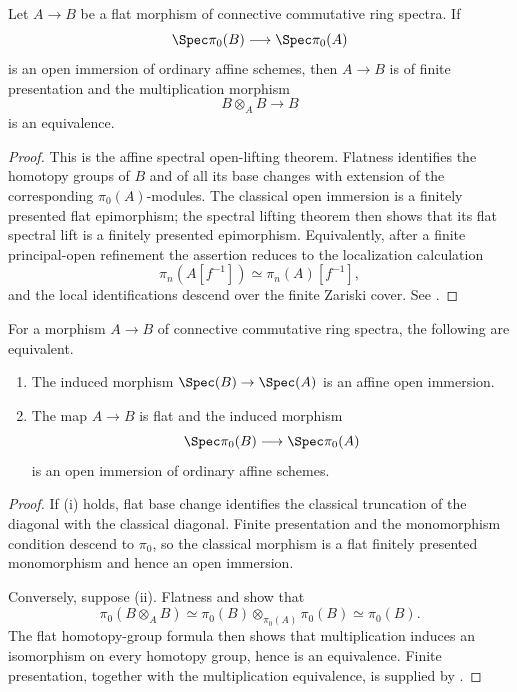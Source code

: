 \begin{proposition}
\label{prop:flat-lift-classical-affine-open}
Let $A\to B$ be a flat morphism of connective commutative ring spectra.
If
\[
    \Spec\pi_0(B)
    \longrightarrow
    \Spec\pi_0(A)
\]
is an open immersion of ordinary affine schemes, then $A\to B$ is of
finite presentation and the multiplication morphism
\[
    B\otimes_A B
    \longrightarrow
    B
\]
is an equivalence.
\end{proposition}

\begin{proof}
This is the affine spectral open-lifting theorem. Flatness identifies the
homotopy groups of $B$ and of all its base changes with extension of the
corresponding $\pi_0(A)$-modules. The classical open immersion is a
finitely presented flat epimorphism; the spectral lifting theorem then
shows that its flat spectral lift is a finitely presented epimorphism.
Equivalently, after a finite principal-open refinement the assertion
reduces to the localization calculation
\[
    \pi_n(A[f^{-1}])
    \simeq
    \pi_n(A)[f^{-1}],
\]
and the local identifications descend over the finite Zariski cover. See
\cite{LurieSAG,KhanBraveNewMotivicI}.
\end{proof}

\begin{theorem}
\label{thm:classical-characterization-affine-opens}
For a morphism $A\to B$ of connective commutative ring spectra, the
following are equivalent.
\begin{enumerate}[label=(\roman*)]
    \item The induced morphism $\Spec(B)\to\Spec(A)$ is an affine open
    immersion.

    \item The map $A\to B$ is flat and the induced morphism
    \[
        \Spec\pi_0(B)
        \longrightarrow
        \Spec\pi_0(A)
    \]
    is an open immersion of ordinary affine schemes.
\end{enumerate}
\end{theorem}

\begin{proof}
If (i) holds, flat base change identifies the classical truncation of the
diagonal with the classical diagonal. Finite presentation and the
monomorphism condition descend to $\pi_0$, so the classical morphism is a
flat finitely presented monomorphism and hence an open immersion.

Conversely, suppose (ii). Flatness and
 show that
\[
    \pi_0(B\otimes_A B)
    \simeq
    \pi_0(B)
    \otimes_{\pi_0(A)}
    \pi_0(B)
    \simeq
    \pi_0(B).
\]
The flat homotopy-group formula then shows that multiplication induces an
isomorphism on every homotopy group, hence is an equivalence. Finite
presentation, together with the multiplication equivalence, is supplied by
.
\end{proof}

